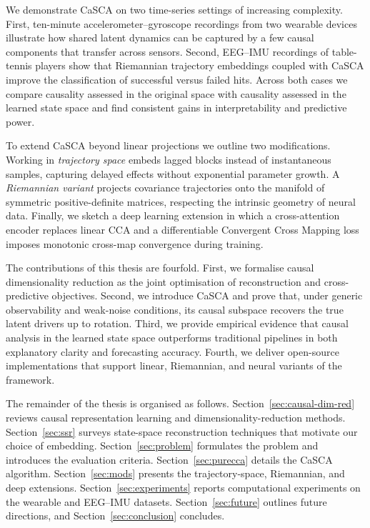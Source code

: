 \documentclass[14pt]{extarticle}
\begin{document}
	We demonstrate CaSCA on two time-series settings of increasing complexity.  
	First, ten-minute accelerometer–gyroscope recordings from two wearable devices illustrate how shared latent dynamics can be captured by a few causal components that transfer across sensors.  
	Second, EEG–IMU recordings of table-tennis players show that Riemannian trajectory embeddings coupled with CaSCA improve the classification of successful versus failed hits.  
	Across both cases we compare causality assessed in the original space with causality assessed in the learned state space and find consistent gains in interpretability and predictive power.  
	
	To extend CaSCA beyond linear projections we outline two modifications.  
	Working in \emph{trajectory space} embeds lagged blocks instead of instantaneous samples, capturing delayed effects without exponential parameter growth.  
	A \emph{Riemannian variant} projects covariance trajectories onto the manifold of symmetric positive-definite matrices, respecting the intrinsic geometry of neural data.  
	Finally, we sketch a deep learning extension in which a cross-attention encoder replaces linear CCA and a differentiable Convergent Cross Mapping loss imposes monotonic cross-map convergence during training.  
	
	The contributions of this thesis are fourfold.  
	First, we formalise causal dimensionality reduction as the joint optimisation of reconstruction and cross-predictive objectives.  
	Second, we introduce CaSCA and prove that, under generic observability and weak-noise conditions, its causal subspace recovers the true latent drivers up to rotation.  
	Third, we provide empirical evidence that causal analysis in the learned state space outperforms traditional pipelines in both explanatory clarity and forecasting accuracy.  
	Fourth, we deliver open-source implementations that support linear, Riemannian, and neural variants of the framework.  
	
	The remainder of the thesis is organised as follows.  
	Section~\ref{sec:causal-dim-red} reviews causal representation learning and dimensionality-reduction methods.  
	Section~\ref{sec:ssr} surveys state-space reconstruction techniques that motivate our choice of embedding.  
	Section~\ref{sec:problem} formulates the problem and introduces the evaluation criteria.  
	Section~\ref{sec:purecca} details the CaSCA algorithm.  
	Section~\ref{sec:mods} presents the trajectory-space, Riemannian, and deep extensions.  
	Section~\ref{sec:experiments} reports computational experiments on the wearable and EEG–IMU datasets.  
	Section~\ref{sec:future} outlines future directions, and Section~\ref{sec:conclusion} concludes.  
	
\end{document}
